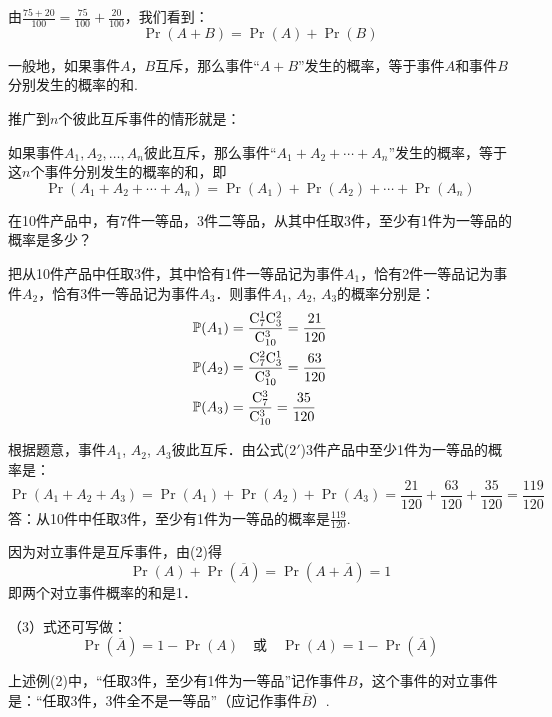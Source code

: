 由$\frac{75+20}{100}=\frac{75}{100}+\frac{20}{100}$，我们看到：
\begin{equation}
\Pr(A+B)=\Pr(A)+\Pr(B) \tag{2}
\end{equation}

一般地，如果事件$A$，$B$互斥，那么事件“$A+B$”发生的概率，等于事件$A$和事件$B$分别发生的概率的和.

推广到$n$个彼此互斥事件的情形就是：

如果事件$A_1,A_2,\ldots,A_n$彼此互斥，那么事件“$A_1+A_2+\cdots+A_n$”发生的概率，等于这$n$个事件分别发生的概率的和，即
\begin{equation}
    \Pr(A_1+A_2+\cdots+A_n)=\Pr(A_1)+\Pr(A_2)+\cdots +\Pr(A_n)\tag{2$'$}
\end{equation}

\begin{example}
    在10件产品中，有7件一等品，3件二等品，从其中任取3件，至少有1件为一等品的概率是多少？
\end{example}

\begin{solution}
    把从10件产品中任取3件，其中恰有1件一等品记为事件$A_1$，恰有2件一等品记为事件$A_2$，恰有3件一等品记为事件$A_3$．则事件$A_1$, $A_2$, $A_3$的概率分别是：
\[\begin{split}
 \Pr(A_1)&=\frac{{\rm C}_7^1{\rm C}_3^2}{{\rm C}_{10}^3}=\frac{21}{120}\\
\Pr(A_2)&=\frac{{\rm C}_7^2{\rm C}_3^1}{{\rm C}_{10}^3}=\frac{63}{120}\\
\Pr(A_3)&=\frac{{\rm C}_7^3}{{\rm C}_{10}^3}=\frac{35}{120}  
\end{split}\]

根据题意，事件$A_1$, $A_2$, $A_3$彼此互斥．由公式($2'$)3件产品中至少1件为一等品的概率是：
\[\Pr(A_1+A_2+A_3)=\Pr(A_1)+\Pr(A_2)+\Pr(A_3)=\frac{21}{120}+\frac{63}{120}+\frac{35}{120}=\frac{119}{120}\]
答：从10件中任取3件，至少有1件为一等品的概率是$\frac{119}{120}$.
\end{solution}


因为对立事件是互斥事件，由(2)得
\begin{equation}
  \Pr(A)+\Pr(\overline{A})=\Pr(A+\overline{A})=1  \tag{3}
\end{equation}
即两个对立事件概率的和是1．

（3）式还可写做：
\begin{equation}
    \Pr(\overline{A})=1-\Pr(A)\quad \text{或}\quad \Pr(A)=1-\Pr(\overline{A}) \tag{$3'$}
\end{equation}

上述例(2)中，“任取3件，至少有1件为一等品”记作事件$B$，这个事件的对立事件是：“任取3件，3件全不是一等品”（应记作事件$\overline{B}$）.

